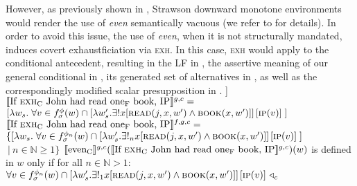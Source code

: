 However, as previously shown in , Strawson downward monotone environments would render the use of \textit{even} semantically vacuous (we refer to  for details). In order to avoid this issue, the use of \textit{even}, when it is not structurally mandated, induces covert exhaustficiation via {\scshape exh}. In this case, {\scshape exh} would apply to the conditional antecedent, resulting in the LF in , the assertive meaning of our general conditional in , its generated set of alternatives in , as well as the correspondingly modified scalar presupposition in .
\pex[nopreamble=true]\label{ex:ds-neutral-conditional-exh}%
\a[]\phantomsection [even\textsubscript{C} [If {\scshape exh}\textsubscript{C} John had read one\textsubscript{F} book, IP]]
\a{} $\intension[g,c]{If {\scshape exh}\textsubscript{C} John had read one\textsubscript{F} book, IP}=$\\$[\lambda w_s.\hspace{1mm}\forall v\in f^{\phi}_\sigma(w)\cap [\lambda w'_s.\exists!{x}[\predicate{read}(j,x,w')\land\predicate{book}(x,w')]]\hspace{0.5mm}[\predicate{ip}(v)]\hspace{1mm}]$
\a{} $\intension[f,g,c]{If {\scshape exh}\textsubscript{C} John had read one\textsubscript{F} book, IP}=$\\$\{[\lambda w_s.\hspace{1mm}\forall v\in f^{\phi_n}_\sigma(w)\cap [\lambda w'_s.\exists!_n{x}[\predicate{read}(j,x,w')\land\predicate{book}(x,w')]]\hspace{0.5mm}[\predicate{ip}(v)]\hspace{1mm}]$\\\emptyfill$~|~n\in\mathbb{N}\geqslant1\}$
\xe\vspace{-2\baselineskip}
\ex{}
$\intension[g,c]{even\textsubscript{C}}(\intension[g,c]{If {\scshape exh}\textsubscript{C} John had read one\textsubscript{F} book, IP})(w)$ is defined in $w$ only if for all $n\in\mathbb{N}>1$:\\
$\forall v\in f^{\phi_n}_\sigma(w)\cap [\lambda w'_s.\exists!_1{x}[\predicate{read}(j,x,w')\land\predicate{book}(x,w')]]\hspace{0.5mm}[\predicate{ip}(v)]~\lprob_c$\\\emptyfill
